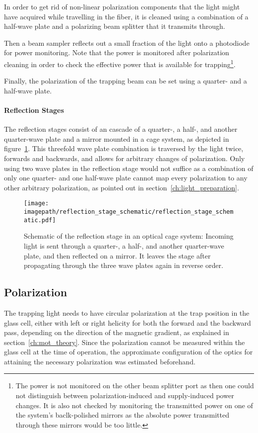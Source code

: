 In order to get rid of non-linear polarization components that the light might have acquired while travelling in the fiber, it is cleaned using a combination of a half-wave plate and a polarizing beam splitter that it transmits through.

Then a beam sampler reflects out a small fraction of the light onto a photodiode for power monitoring. Note that the power is monitored after polarization cleaning in order to check the effective power that is available for trapping\footnote{The power is not monitored on the other beam splitter port as then one could not distinguish between polarization-induced and supply-induced power changes. It is also not checked by monitoring the transmitted power on one of the system's baclk-polished mirrors as the absolute power transmitted through these mirrors would be too little.}.

Finally, the polarization of the trapping beam can be set using a quarter- and a half-wave plate.

\paragraph{Reflection Stages}
The reflection stages consist of an cascade of a quarter-, a half-, and another quarter-wave plate and a mirror mounted in a cage system, as depicted in figure~\ref{fig:reflection_stage_schematic}. This threefold wave plate combination is traversed by the light twice, forwards and backwards, and allows for arbitrary changes of polarization. Only using two wave plates in the reflection stage would not suffice as a combination of only one quarter- and one half-wave plate cannot map every polarization to any other arbitrary polarization, as pointed out in section~\ref{ch:light_preparation}.

\begin{figure}
    \centering
    \texttt{[image: \\imagepath/reflection\_stage\_schematic/reflection\_stage\_schematic.pdf]}
    \caption{Schematic of the reflection stage in an optical cage system: Incoming light is sent through a quarter-, a half-, and another quarter-wave plate, and then reflected on a mirror. It leaves the stage after propagating through the three wave plates again in reverse order.}
    \label{fig:reflection_stage_schematic}
\end{figure}

\subsection*{Polarization}
The trapping light needs to have circular polarization at the trap position in the glass cell, either with left or right helicity for both the forward and the backward pass, depending on the direction of the magnetic gradient, as explained in section~\ref{ch:mot_theory}. Since the polarization cannot be measured within the glass cell at the time of operation, the approximate configuration of the optics for attaining the necessary polarization was estimated beforehand.

